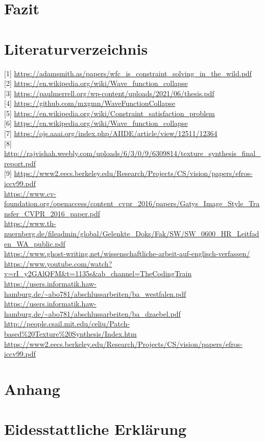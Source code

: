 \documentclass[12pt]{report}
\begin{document}
{\let\clearpage\relax\chapter{Fazit}}

{\let\clearpage\relax\chapter{Literaturverzeichnis}}
{[1]} \url{https://adamsmith.as/papers/wfc_is_constraint_solving_in_the_wild.pdf}\\
{[2]} \url{https://en.wikipedia.org/wiki/Wave_function_collapse}\\
{[3]} \url{https://paulmerrell.org/wp-content/uploads/2021/06/thesis.pdf}\\
{[4]} \url{https://github.com/mxgmn/WaveFunctionCollapse}\\
{[5]} \url{https://en.wikipedia.org/wiki/Constraint_satisfaction_problem}\\
{[6]} \url{https://en.wikipedia.org/wiki/Wave_function_collapse}\\
{[7]} \url{https://ojs.aaai.org/index.php/AIIDE/article/view/12511/12364}\\
{[8]} \url{http://rajvishah.weebly.com/uploads/6/3/0/9/6309814/texture_synthesis_final_report.pdf}\\
{[9]} \url{https://www2.eecs.berkeley.edu/Research/Projects/CS/vision/papers/efros-iccv99.pdf}\\
\url{https://www.cv-foundation.org/openaccess/content_cvpr_2016/papers/Gatys_Image_Style_Transfer_CVPR_2016_paper.pdf}\\
\url{https://www.th-nuernberg.de/fileadmin/global/Gelenkte_Doks/Fak/SW/SW_0600_HR_Leitfaden_WA_public.pdf}\\
\url{https://www.ghost-writing.net/wissenschaftliche-arbeit-auf-englisch-verfassen/}\\
\url{https://www.youtube.com/watch?v=rI_y2GAlQFM&t=1135s&ab_channel=TheCodingTrain}\\
\url{https://users.informatik.haw-hamburg.de/~abo781/abschlussarbeiten/ba_westfalen.pdf}\\
\url{https://users.informatik.haw-hamburg.de/~abo781/abschlussarbeiten/ba_dzaebel.pdf}\\
\url{http://people.csail.mit.edu/celiu/Patch-based%20Texture%20Synthesis/Index.htm}\\
\url{https://www2.eecs.berkeley.edu/Research/Projects/CS/vision/papers/efros-iccv99.pdf}\\


{\let\clearpage\relax\chapter{Anhang}}
{\let\clearpage\relax\chapter{Eidesstattliche Erklärung}}
\end{document}
